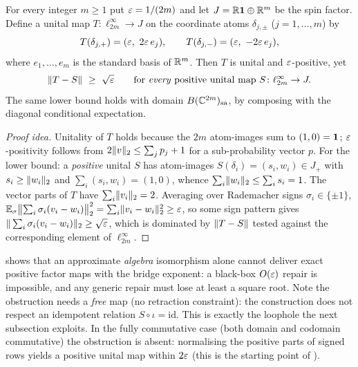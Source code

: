\begin{proposition}
\label{prop:rounding-fails}
For every integer $m\ge1$ put $\varepsilon=1/(2m)$ and let $J=\mathbb{R}\mathbf{1}\oplus\mathbb{R}^{m}$ be the
spin factor. Define a unital map $T\colon\ell^{\infty}_{2m}\to J$ on the
coordinate atoms $\delta_{j,\pm}$ \textup{(}$j=1,\dots,m$\textup{)} by
\[
  T(\delta_{j,+})=(\varepsilon,\ 2\varepsilon\,e_j),\qquad
  T(\delta_{j,-})=(\varepsilon,\ -2\varepsilon\,e_j),
\]
where $e_1,\dots,e_m$ is the standard basis of $\mathbb{R}^{m}$. Then $T$ is unital and
$\varepsilon$-positive, yet
\[
  \lVert T-S \rVert\ \ge\ \sqrt{\varepsilon}
  \qquad\text{for \emph{every} positive unital map } S\colon\ell^{\infty}_{2m}\to J.
\]
The same lower bound holds with domain $B(\mathbb{C}^{2m})_{\mathrm{sa}}$, by composing
with the diagonal conditional expectation.
\end{proposition}

\begin{proof}[Proof idea]
Unitality of $T$ holds because the $2m$ atom-images sum to $(1,0)=\mathbf{1}$;
$\varepsilon$-positivity follows from $2\lVert v \rVert_2\le\sum_j p_j+1$ for a sub-probability
vector $p$. For the lower bound: a \emph{positive} unital $S$ has atom-images
$S(\delta_i)=(s_i,w_i)\in J_+$ with $s_i\ge\lVert w_i \rVert_2$ and
$\sum_i(s_i,w_i)=(1,0)$, whence $\sum_i\lVert w_i \rVert_2\le\sum_i s_i=1$. The
vector parts of $T$ have $\sum_i\lVert v_i \rVert_2=2$. Averaging over Rademacher signs
$\sigma_i\in\{\pm1\}$,
$\mathbb E_\sigma\bigl\Vert\sum_i\sigma_i(v_i-w_i)\bigr\Vert_2^2
   =\sum_i\lVert v_i-w_i \rVert_2^2\ge\varepsilon$,
so some sign pattern gives $\Vert\sum_i\sigma_i(v_i-w_i)\Vert_2\ge\sqrt{\varepsilon}$,
which is dominated by $\lVert T-S \rVert$ tested against the corresponding element of
$\ell^{\infty}_{2m}$.
\end{proof}

 shows that an approximate \emph{algebra} isomorphism
alone cannot deliver exact positive factor maps with the bridge exponent: a
black-box $O(\varepsilon)$ repair is impossible, and any generic repair must lose at
least a square root. Note the obstruction needs a \emph{free} map (no retraction
constraint): the construction does not respect an idempotent relation
$S\circ\iota=\mathrm{id}$. This is exactly the loophole the next subsection
exploits. In the fully commutative case (both domain and codomain commutative)
the obstruction is absent: normalising the positive parts of signed rows yields a
positive unital map within $2\varepsilon$ (this is the starting point of
).

